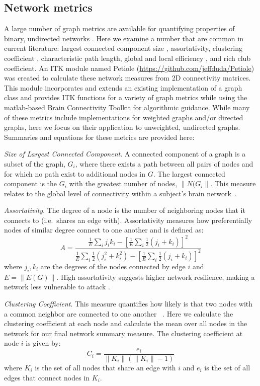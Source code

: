 \documentclass{frontiersSCNS} %
\begin{document}
\subsection{Network metrics}
A large number of graph metrics are available for quantifying properties of binary, undirected networks \citep{Rubinov2010}. Here we examine a number that 
are common in current literature: largest connected component size \citep{Bassett2011N}, assortativity\citep{Newman2006a,Bassett2008}, clustering coefficient \citep{Watts1998}, characteristic path length\citep{Watts1998}, global and local efficiency \citep{Latora2001}, and rich club coefficient\citep{Collin2013}. An ITK module named Petiole (\url{https://github.com/jeffduda/Petiole}) was created to calculate these network measures from 2D connectivity
matrices. This module incorporates and extends an existing implementation of a graph class \citep{Tustison2008} and provides ITK functions for a variety of graph metrics while using the matlab-based Brain Connectivity Toolkit \citep{Rubinov2010} for algorithmic guidance. While many of these metrics include implementations for weighted graphs and/or directed graphs, here we focus on their application to unweighted, undirected graphs. Summaries and equations for these metrics are provided here:

\emph{Size of Largest Connected Component}.  A connected component of a graph is a subset of the graph, $G_{i}$, where there exists a path between all pairs of nodes and for which no path exist to additional nodes in $G$. The largest connected component is the $G_{i}$ with the greatest number of nodes, $\|N(G_{i}\|$. This measure relates to the global level of connectivity within a subject's brain network~\cite{Bassett2011N}.

\emph{Assortativity}. The degree of a node is the number of neighboring nodes that it connects to (i.e.\ shares an edge with). Assortativity measures how preferentially nodes of similar degree connect to one another \citep{Newman2006a} and is defined as:
$$A =  \frac{ \frac{1}{E} \sum_{i}{j_i k_i} - [ \frac{1}{E} \sum_{i}{ \frac{1}{2} (j_i + k_i)} ]^2 }{ \frac{1}{E} \sum_{i}{ \frac{1}{2}( j_{i}^{2} + k_{i}^{2} ) } - [ \frac{1}{E} \sum_{i}{ \frac{1}{2} (j_i + k_i)} ]^2  } $$
where $j_i,k_i$ are the degrees of the nodes connected by edge $i$ and $E = \|E(G)\|$. High assortativity suggests higher network resilience, making a network less vulnerable to attack \citep{Newman2002}.

\emph{Clustering Coefficient}. This measure quantifies how likely is that two nodes with a common neighbor are connected to one another ~\citep{Watts1998}. Here we calculate the clustering coefficient at each node and calculate the mean over all nodes in the network for our final network summary measure. The clustering coefficient at node $i$ is given by:
$$C_i = \frac{e_i}{\|K_i\| ( \|K_i\| -1 )}$$
where $K_i$ is the set of all nodes that share an edge with $i$ and $e_i$ is the set of all edges that connect nodes in $K_i$.
\end{document}
